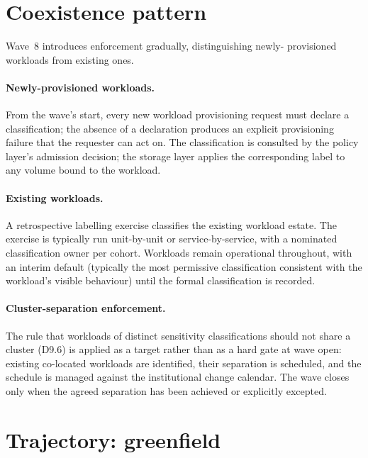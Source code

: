 \section{Coexistence pattern}
\label{sec:w8-coexistence}

Wave~8 introduces enforcement gradually, distinguishing newly-
provisioned workloads from existing ones.

\paragraph{Newly-provisioned workloads.} From the wave's start,
every new workload provisioning request must declare a
classification; the absence of a declaration produces an explicit
provisioning failure that the requester can act on. The
classification is consulted by the policy layer's admission
decision; the storage layer applies the corresponding label to
any volume bound to the workload.

\paragraph{Existing workloads.} A retrospective labelling
exercise classifies the existing workload estate. The exercise is
typically run unit-by-unit or service-by-service, with a
nominated classification owner per cohort. Workloads remain
operational throughout, with an interim default (typically the
most permissive classification consistent with the workload's
visible behaviour) until the formal classification is recorded.

\paragraph{Cluster-separation enforcement.} The rule that
workloads of distinct sensitivity classifications should not
share a cluster (D9.6) is applied as a target rather than as a
hard gate at wave open: existing co-located workloads are
identified, their separation is scheduled, and the schedule is
managed against the institutional change calendar. The wave
closes only when the agreed separation has been achieved or
explicitly excepted.

\section{Trajectory: greenfield}
\label{sec:w8-greenfield}

